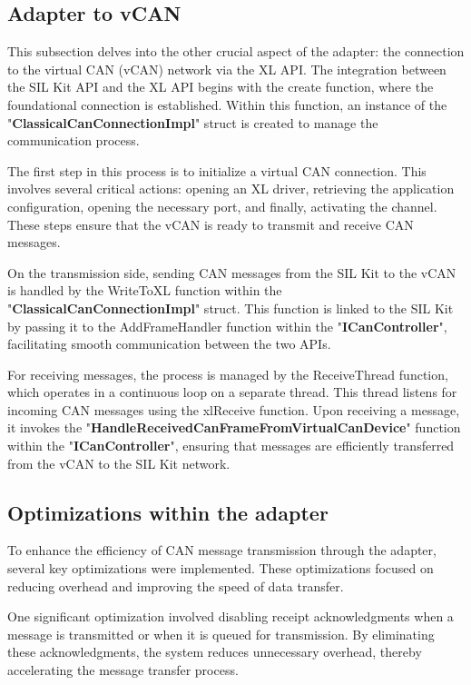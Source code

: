 \subsection{Adapter to vCAN}
  
This subsection delves into the other crucial aspect of the adapter: the connection to the virtual CAN (vCAN) network via the XL API. The integration between the SIL Kit API and the XL API begins with the create function, where the foundational connection is established. Within this function, an instance of the "\textbf{ClassicalCanConnectionImpl}" struct is created to manage the communication process.

The first step in this process is to initialize a virtual CAN connection. This involves several critical actions: opening an XL driver, retrieving the application configuration, opening the necessary port, and finally, activating the channel. These steps ensure that the vCAN is ready to transmit and receive CAN messages. \cite{xl_driver_library_manual}

On the transmission side, sending CAN messages from the SIL Kit to the vCAN is handled by the WriteToXL function within the "\textbf{ClassicalCanConnectionImpl}" struct. This function is linked to the SIL Kit by passing it to the AddFrameHandler function within the "\textbf{ICanController}", facilitating smooth communication between the two APIs.

For receiving messages, the process is managed by the ReceiveThread function, which operates in a continuous loop on a separate thread. This thread listens for incoming CAN messages using the xlReceive function. Upon receiving a message, it invokes the "\textbf{HandleReceivedCanFrameFromVirtualCanDevice}" function within the "\textbf{ICanController}", ensuring that messages are efficiently transferred from the vCAN to the SIL Kit network.

\subsection{Optimizations within the adapter}
To enhance the efficiency of CAN message transmission through the adapter, several key optimizations were implemented. These optimizations focused on reducing overhead and improving the speed of data transfer.

One significant optimization involved disabling receipt acknowledgments when a message is transmitted or when it is queued for transmission. By eliminating these acknowledgments, the system reduces unnecessary overhead, thereby accelerating the message transfer process.


